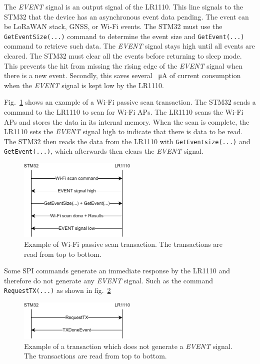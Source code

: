The \textit{EVENT} signal is an output signal of the LR1110. This line signals to the STM32 that the device has an asynchronous event data pending. The event can be \ac{LoRaWAN} stack, \ac{GNSS}, or Wi-Fi events. The STM32 must use the \lstinline[style=C++]{GetEventSize(...)} command to determine the event size and \lstinline[style=C++]{GetEvent(...)} command to retrieve such data. The \textit{EVENT} signal stays high until all events are cleared. The STM32 must clear all the events before returning to sleep mode. This prevents the hit from missing the rising edge of the \textit{EVENT} signal when there is a new event. Secondly, this saves several \SI{}{\micro\ampere} of current consumption when the \textit{EVENT} signal is kept low by the LR1110.

Fig.~\ref{fig:event_example} shows an example of a Wi-Fi passive scan transaction. The STM32 sends a command to the LR1110 to scan for Wi-Fi \ac{AP}s. The LR1110 scans the Wi-Fi \ac{AP}s and stores the data in its internal memory. When the scan is complete, the LR1110 sets the \textit{EVENT} signal high to indicate that there is data to be read. The STM32 then reads the data from the LR1110 with \lstinline[style=C++]{GetEventsize(...)} and \lstinline[style=C++]{GetEvent(...)}, which afterwards then clears the \textit{EVENT} signal.

\begin{figure}[H]
    \centering
    \includegraphics[width=0.5\textwidth]{figures/event_example.png}
    \caption{Example of Wi-Fi passive scan transaction. The transactions are read from top to bottom.}
    \label{fig:event_example}
\end{figure}

Some \ac{SPI} commands generate an immediate response by the LR1110 and therefore do not generate any \textit{EVENT} signal. Such as the command \lstinline[style=C++]{RequestTX(...)} as shown in fig.~\ref{fig:event_example_2}

\begin{figure}[H]
    \centering
    \includegraphics[width=0.5\textwidth]{figures/event_example_2.png}
    \caption{Example of a transaction which does not generate a \textit{EVENT} signal. The transactions are read from top to bottom.}
    \label{fig:event_example_2}
\end{figure}

